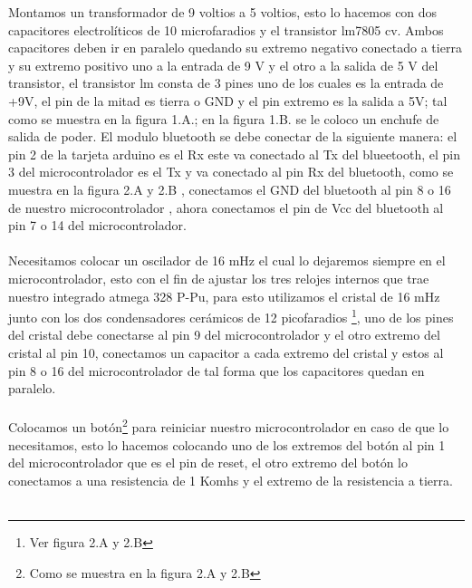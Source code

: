 \documentclass[12]{article}
\begin{document}
\begin{multicols}{2}
Montamos un transformador de 9 voltios a 5 voltios, esto lo hacemos con dos capacitores electrolíticos de 10 microfaradios  y el transistor lm7805\cite{REGULADOR} cv. Ambos  capacitores deben ir en paralelo quedando su extremo negativo conectado a tierra y su extremo positivo uno a la entrada de 9 V y el otro a la salida de 5 V del transistor, el transistor lm consta de 3 pines uno de los cuales es la entrada de +9V, el pin de la mitad es tierra o GND y el pin extremo es la salida a 5V; tal como se muestra en la figura 1.A.; en la figura 1.B. se le coloco un enchufe de salida de poder.
El modulo bluetooth se debe conectar de la siguiente manera: el pin 2 de la tarjeta arduino es el Rx este va conectado al Tx del blueetooth, el pin 3 del microcontrolador es el Tx y va conectado al pin Rx del bluetooth, como se muestra en la figura 2.A y 2.B , conectamos el GND del bluetooth al pin 8  o 16 de nuestro microcontrolador , ahora conectamos el pin de Vcc del bluetooth al pin 7 o 14 del microcontrolador. \\\\
Necesitamos colocar un oscilador de 16 mHz el cual lo dejaremos siempre en el microcontrolador, esto  con el fin de ajustar los tres relojes internos que trae nuestro integrado atmega 328 P-Pu, para esto utilizamos el cristal de 16 mHz junto con los dos condensadores cerámicos de 12 picofaradios \footnote{Ver figura 2.A y 2.B}, uno de los pines del cristal debe conectarse al pin 9 del microcontrolador y el otro extremo del cristal al pin 10, conectamos un capacitor a cada extremo del cristal y estos al pin 8 o 16 del microcontrolador de tal forma que los capacitores quedan en paralelo. \\\\
Colocamos un botón\footnote{Como se muestra en la figura 2.A y 2.B} para reiniciar nuestro microcontrolador en caso de que lo necesitamos, esto lo hacemos colocando uno de los extremos del botón al pin 1 del microcontrolador que es el pin de reset, el otro extremo del botón lo conectamos a una resistencia de 1 Komhs y el extremo de la resistencia a tierra.\\\\


\end{multicols}
\end{document}
